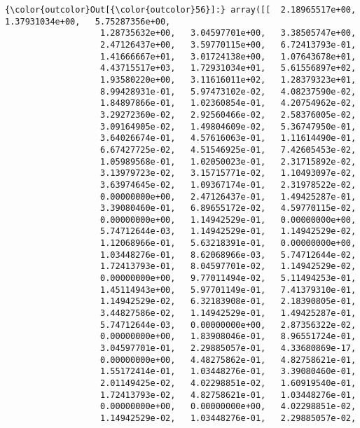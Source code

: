 \documentclass[11pt]{article}
\begin{document}
\begin{Verbatim}[commandchars=\\\{\}]
{\color{outcolor}Out[{\color{outcolor}56}]:} array([[  2.18965517e+00,   1.37931034e+00,   5.75287356e+00,
                   1.28735632e+00,   3.04597701e+00,   3.38505747e+00,
                   2.47126437e+00,   3.59770115e+00,   6.72413793e-01,
                   1.41666667e+01,   3.01724138e+00,   1.07643678e+01,
                   4.43715517e+03,   1.72931034e+01,   5.61556897e+02,
                   1.93580220e+00,   3.11616011e+02,   1.28379323e+01,
                   8.99428931e-01,   5.97473102e-02,   4.08237590e-02,
                   1.84897866e-01,   1.02360854e-01,   4.20754962e-02,
                   3.29272360e-02,   2.92560466e-02,   2.58376005e-02,
                   3.09164905e-02,   1.49804609e-02,   5.36747950e-01,
                   3.64026674e-01,   4.57616063e-01,   1.11614490e-01,
                   6.67427725e-02,   4.51546925e-01,   7.42605453e-02,
                   1.05989568e-01,   1.02050023e-01,   2.31715892e-02,
                   3.13979723e-02,   3.15715771e-02,   1.10493097e-02,
                   3.63974645e-02,   1.09367174e-01,   2.31978522e-02,
                   0.00000000e+00,   2.47126437e-01,   1.49425287e-01,
                   3.39080460e-01,   6.89655172e-02,   4.59770115e-02,
                   0.00000000e+00,   1.14942529e-01,   0.00000000e+00,
                   5.74712644e-03,   1.14942529e-01,   1.14942529e-02,
                   1.12068966e-01,   5.63218391e-01,   0.00000000e+00,
                   1.03448276e-01,   8.62068966e-03,   5.74712644e-02,
                   1.72413793e-01,   8.04597701e-02,   1.14942529e-02,
                   0.00000000e+00,   9.77011494e-02,   5.11494253e-01,
                   1.45114943e+00,   5.97701149e-01,   7.41379310e-01,
                   1.14942529e-02,   6.32183908e-01,   2.18390805e-01,
                   3.44827586e-02,   1.14942529e-01,   1.49425287e-01,
                   5.74712644e-03,   0.00000000e+00,   2.87356322e-02,
                   0.00000000e+00,   1.83908046e-01,   8.96551724e-01,
                   3.04597701e-01,   2.29885057e-01,   4.33680869e-17,
                   0.00000000e+00,   4.48275862e-01,   4.82758621e-01,
                   1.55172414e-01,   1.03448276e-01,   3.39080460e-01,
                   2.01149425e-02,   4.02298851e-02,   1.60919540e-01,
                   1.72413793e-02,   4.82758621e-01,   1.03448276e-01,
                   0.00000000e+00,   0.00000000e+00,   4.02298851e-02,
                   1.14942529e-02,   1.03448276e-01,   2.29885057e-02,

\end{Verbatim}
\end{document}
